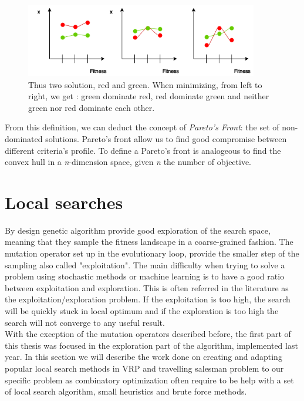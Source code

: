 \documentclass[12pt]{memoir}
\begin{document}
\begin{figure}[htbp]
	\begin{center}
		\includegraphics[width=4in]{img/paretoDominance.png}
		\caption{Thus two solution, red and green. When minimizing, from left to right, we get : green dominate red, red dominate green and neither green nor red dominate each other.}
	\end{center}
\end{figure}



From this definition, we can deduct the concept of \emph{Pareto's Front}: the set
of non-dominated solutions. Pareto's front allow us to find good compromise between
different criteria's profile. To define a Pareto's front is analogeous to find the convex
hull\cite{godfrey2007algorithms} in a \textit{n}-dimension space, given \textit{n} the number of objective.

\label{par:Multi-objective selection }

\newpage

\section{Local searches}
By design genetic algorithm provide good exploration of the search space, meaning
that they sample the fitness landscape in a coarse-grained\cite{mitchell1998introduction} fashion.
The mutation operator set up in the evolutionary loop, provide the smaller step
of the sampling also called "exploitation". The main difficulty when trying to 
solve a problem using stochastic methods or machine learning is to have a
good ratio between exploitation and exploration. This is often referred in the
literature as the exploitation/exploration problem. If the exploitation is too high,
the search will be quickly stuck in local optimum and if the exploration is too high
the search will not converge to any useful result\cite{mitchell1998introduction}. \\
With the exception of the mutation operators described before, the first part of this
thesis was focused in the exploration part of the algorithm, implemented last year.
In this section we will describe the work done on creating and adapting popular local
search methods in VRP and travelling salesman problem to our specific problem as combinatory
optimization often require to be help with a set of local search algorithm, small heuristics and brute force methods.
\end{document}
